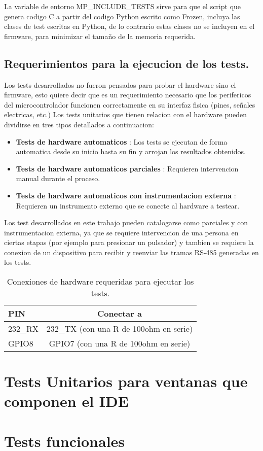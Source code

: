 La variable de entorno MP\_INCLUDE\_TESTS sirve para que el script que genera codigo C a partir del codigo Python escrito como Frozen, incluya las clases de test escritas en Python, de lo contrario estas clases no se incluyen en el firmware, para minimizar el tamaño de la memoria requerida.

\subsection{Requerimientos para la ejecucion de los tests.}
\label{sec:requerimientosEjecucionTests}

Los tests desarrollados no fueron pensados para probar el hardware sino el firmware, esto quiere decir que es un requerimiento necesario que los perifericos del microcontrolador funcionen correctamente en su interfaz fisica (pines, señales electricas, etc.)
Los tests unitarios que tienen relacion con el hardware pueden dividirse en tres tipos\cite{tdd} detallados a continuacion:

\begin{itemize}
	\item \textbf{Tests de hardware automaticos} : Los tests se ejecutan de forma automatica desde su inicio hasta su fin y arrojan los resultados obtenidos.
	\item \textbf{Tests de hardware automaticos parciales} : Requieren intervencion manual durante el proceso.
	\item \textbf{Tests de hardware automaticos con instrumentacion externa} : Requieren un instrumento externo que se conecte al hardware a testear.
\end{itemize}

Los test desarrollados en este trabajo pueden catalogarse como parciales y con instrumentacion externa, ya que se requiere intervencion de una persona en ciertas etapas (por ejemplo para presionar un pulsador) y tambien se requiere la conexion de un dispositivo para recibir y reenviar las tramas RS-485 generadas en los tests.

\begin{table}[h]
	\centering
	\caption[]{Conexiones de hardware requeridas para ejecutar los tests.}
	\begin{tabular}{l c}    
		\toprule
		\textbf{PIN} 	 	& \textbf{Conectar a}   									\\
		\midrule
		232\_RX	 				& 232_TX (con una R de 100ohm en serie)		\\	
		GPIO8	 					& GPIO7 (con una R de 100ohm en serie)		\\		
		\bottomrule
		\hline
	\end{tabular}
	\label{tab:methfn}
\end{table}






\section{Tests Unitarios para ventanas que componen el IDE}
\label{sec:testUnitariosIDE}

\section{Tests funcionales}
\label{sec:testFuncionales}